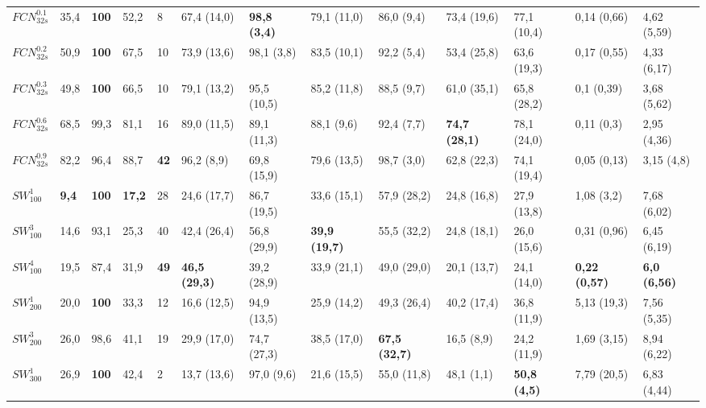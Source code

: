 \documentclass[a4paper,authoryear,review]{elsarticle}
\begin{document}
\begin{table}[]
\begin{adjustbox}{angle=90}
\begin{tabular}{lllllllllllll}
			$FCN_{32s}^{0.1}$ & 35,4 & \cellcolor[HTML]{81D41A}\textbf{100} & 52,2 & 8 & 67,4 (14,0) & \cellcolor[HTML]{81D41A}\textbf{98,8 (3,4)} & 79,1 (11,0) & 86,0 (9,4) & 73,4 (19,6) & 77,1 (10,4) & 0,14 (0,66) & 4,62 (5,59) \\
			$FCN_{32s}^{0.2}$ & 50,9 & \cellcolor[HTML]{81D41A}\textbf{100} & 67,5 & 10 & 73,9 (13,6) & 98,1 (3,8) & 83,5 (10,1) & 92,2 (5,4) & 53,4 (25,8) & 63,6 (19,3) & 0,17 (0,55) & 4,33 (6,17) \\
			$FCN_{32s}^{0.3}$ & 49,8 & \cellcolor[HTML]{81D41A}\textbf{100} & 66,5 & 10 & 79,1 (13,2) & 95,5 (10,5) & 85,2 (11,8) & 88,5 (9,7) & 61,0 (35,1) & 65,8 (28,2) & 0,1 (0,39) & 3,68 (5,62) \\
			$FCN_{32s}^{0.6}$ & 68,5 & 99,3 & 81,1 & 16 & 89,0 (11,5) & 89,1 (11,3) & 88,1 (9,6) & 92,4 (7,7) & \cellcolor[HTML]{81D41A}\textbf{74,7 (28,1)} & 78,1 (24,0) & 0,11 (0,3) & 2,95 (4,36) \\
			$FCN_{32s}^{0.9}$ & 82,2 & 96,4 & 88,7 & \cellcolor[HTML]{81D41A}\textbf{42} & 96,2 (8,9) & 69,8 (15,9) & 79,6 (13,5) & 98,7 (3,0) & 62,8 (22,3) & 74,1 (19,4) & 0,05 (0,13) & 3,15 (4,8) \\
			$SW_{100}^{1}$ & \textbf{9,4} & \cellcolor[HTML]{E0C2CD}\textbf{100} & \textbf{17,2} & 28 & 24,6 (17,7) & 86,7 (19,5) & 33,6 (15,1) & 57,9 (28,2) & 24,8 (16,8) & 27,9 (13,8) & 1,08 (3,2) & 7,68 (6,02) \\
			$SW_{100}^{3}$ & 14,6 & 93,1 & 25,3 & 40 & 42,4 (26,4) & 56,8 (29,9) & \cellcolor[HTML]{E0C2CD}\textbf{39,9 (19,7)} & 55,5 (32,2) & 24,8 (18,1) & 26,0 (15,6) & 0,31 (0,96) & 6,45 (6,19) \\
			$SW_{100}^{4}$ & 19,5 & 87,4 & 31,9 & \cellcolor[HTML]{E0C2CD}\textbf{49} & \cellcolor[HTML]{E0C2CD}\textbf{46,5 (29,3)} & 39,2 (28,9) & 33,9 (21,1) & 49,0 (29,0) & 20,1 (13,7) & 24,1 (14,0) & \cellcolor[HTML]{E0C2CD}\textbf{0,22 (0,57)} & \cellcolor[HTML]{E0C2CD}\textbf{6,0 (6,56)} \\
			$SW_{200}^{1}$ & 20,0 & \cellcolor[HTML]{E0C2CD}\textbf{100} & 33,3 & 12 & 16,6 (12,5) & 94,9 (13,5) & 25,9 (14,2) & 49,3 (26,4) & 40,2 (17,4) & 36,8 (11,9) & 5,13 (19,3) & 7,56 (5,35) \\
			$SW_{200}^{3}$ & 26,0 & 98,6 & 41,1 & 19 & 29,9 (17,0) & 74,7 (27,3) & 38,5 (17,0) & \cellcolor[HTML]{E0C2CD}\textbf{67,5 (32,7)} & 16,5 (8,9) & 24,2 (11,9) & 1,69 (3,15) & 8,94 (6,22) \\
			$SW_{300}^{1}$ & 26,9 & \cellcolor[HTML]{E0C2CD}\textbf{100} & 42,4 & 2 & 13,7 (13,6) & 97,0 (9,6) & 21,6 (15,5) & 55,0 (11,8) & 48,1 (1,1) & \cellcolor[HTML]{E0C2CD}\textbf{50,8 (4,5)} & 7,79 (20,5) & 6,83 (4,44) \\

\end{tabular}
\end{adjustbox}
\end{table}
\end{document}
